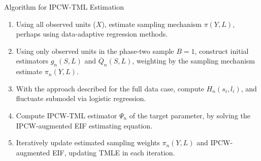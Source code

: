 \documentclass{beamer}
\begin{document}
\begin{frame}[c]{Algorithm for IPCW-TML Estimation}

\begin{center}
\begin{enumerate}\label{ipcwtmle_algo}
  \itemsep8pt
  \item Using all observed units ($X$), estimate sampling mechanism
    $\pi(Y, L)$, perhaps using data-adaptive regression methods.
  \item Using only observed units in the phase-two sample $B = 1$,
    construct initial estimators $g_n(S,L)$ and $\overline{Q}_n(S,L)$,
    weighting by the sampling mechanism estimate $\pi_n(Y,L)$.
  \item With the approach described for the full data case, compute
    $H_n(s_i,l_i)$, and fluctuate submodel via logistic regression.
  \item Compute IPCW-TML estimator $\Psi_n$ of the target parameter, by solving
    the IPCW-augmented EIF estimating equation.
  \item Iteratively update estimated sampling weights $\pi_n(Y,L)$ and
    IPCW-augmented EIF, updating TMLE in each iteration.
\end{enumerate}
\end{center}


\end{frame}

\end{document}
